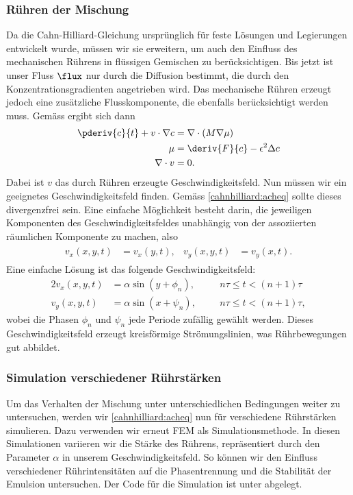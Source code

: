 \subsubsection{Rühren der Mischung}
Da die Cahn-Hilliard-Gleichung ursprünglich für feste Lösungen
und Legierungen entwickelt wurde,
müssen wir sie erweitern,
um auch den Einfluss des mechanischen Rührens in flüssigen Gemischen zu berücksichtigen.
Bis jetzt ist unser Fluss $\flux$ \;nur durch die Diffusion bestimmt,
die durch den Konzentrationsgradienten angetrieben wird.
Das mechanische Rühren erzeugt jedoch eine zusätzliche Flusskomponente,
die ebenfalls berücksichtigt werden muss.
Gemäss \cite{cahnhilliard:deriv-advective} ergibt sich dann
\begin{align}
\begin{aligned}
\pderiv{c}{t} + v \cdot \nabla c
&=
\nabla \cdot (M \nabla \mu)
\\
\mu
&=
\deriv{F}{c} -  \epsilon^2 \Delta c
\\
\nabla \cdot v
&=
0
.
\end{aligned}
\label{cahnhilliard:acheq}
\end{align}
Dabei ist $v$ das durch Rühren erzeugte Geschwindigkeitsfeld.
Nun müssen wir ein geeignetes Geschwindigkeitsfeld finden.
Gemäss \eqref{cahnhilliard:acheq} sollte dieses divergenzfrei sein.
Eine einfache Möglichkeit besteht darin,
die jeweiligen Komponenten des Geschwindigkeitsfeldes
unabhängig von der assoziierten räumlichen Komponente zu machen,
also
\begin{align*}
\begin{aligned}
v_x(x,y,t)
&=
v_x(y,t),
&
v_y(x,y,t)
&=
v_y(x,t)
.
\end{aligned}
\end{align*}
Eine einfache Lösung ist das folgende Geschwindigkeitsfeld:
\begin{alignat*}{2}
v_x(x, y, t)
&=
\alpha \sin(y + \phi_n)
,\quad&
& n \tau \leq t < (n+1) \tau
\\
v_y(x, y, t)
&=
\alpha \sin(x + \psi_n)
,&
& n \tau \leq t < (n+1) \tau
,
\end{alignat*}
wobei die Phasen $\phi_n$ und $\psi_n$ jede Periode zufällig gewählt werden.
Dieses Geschwindigkeitsfeld erzeugt kreisförmige Strömungslinien,
was Rührbewegungen gut abbildet.

\subsubsection{Simulation verschiedener Rührstärken}
Um das Verhalten der Mischung unter unterschiedlichen Bedingungen weiter zu untersuchen,
werden wir \eqref{cahnhilliard:acheq} nun für verschiedene Rührstärken simulieren.
Dazu verwenden wir erneut FEM als Simulationsmethode.
In diesen Simulationen variieren wir die Stärke des Rührens,
repräsentiert durch den Parameter $\alpha$ in unserem Geschwindigkeitsfeld.
So können wir den Einfluss verschiedener Rührintensitäten auf die Phasentrennung
und die Stabilität der Emulsion untersuchen.
Der Code für die Simulation ist unter \cite{cahnhilliard:repo} abgelegt.

